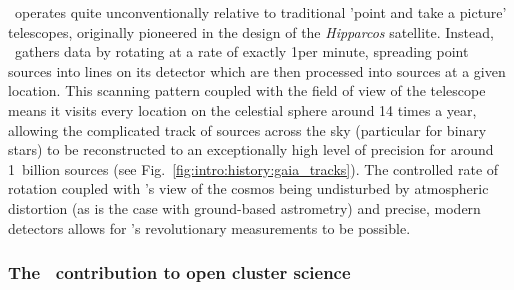 \gaia\ operates quite unconventionally relative to traditional 'point and take a picture' telescopes, originally pioneered in the design of the \emph{Hipparcos} satellite. Instead, \gaia\ gathers data by rotating at a rate of exactly 1\textdegree per minute, spreading point sources into lines on its detector which are then processed into sources at a given location. This scanning pattern coupled with the field of view of the telescope means it visits every location on the celestial sphere around 14 times a year, allowing the complicated track of sources across the sky (particular for binary stars) to be reconstructed to an exceptionally high level of precision for around 1~billion sources (see Fig.~\ref{fig:intro:history:gaia_tracks}). The controlled rate of rotation coupled with \gaia's view of the cosmos being undisturbed by atmospheric distortion (as is the case with ground-based astrometry) and precise, modern detectors allows for \gaia's revolutionary measurements to be possible.

\subsubsection{The \gaia\ contribution to open cluster science}
\label{sec:intro:history:gaia:background}


